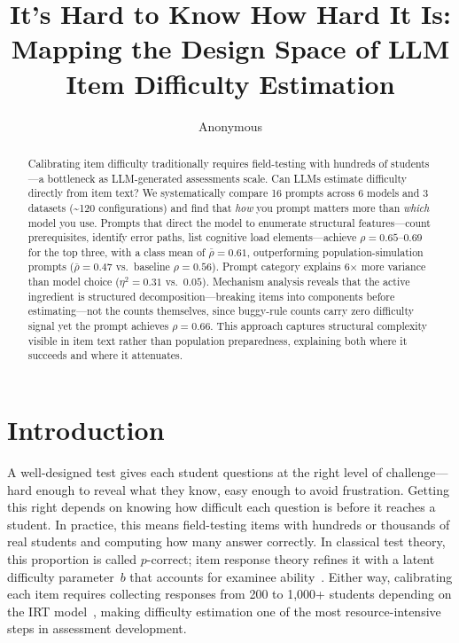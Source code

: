 \documentclass[runningheads]{llncs}
\begin{document}
\title{It's Hard to Know How Hard It Is:\\Mapping the Design Space of LLM Item Difficulty Estimation}

\author{Anonymous}

\maketitle

\begin{abstract}
Calibrating item difficulty traditionally requires field-testing with hundreds of students---a bottleneck as LLM-generated assessments scale. Can LLMs estimate difficulty directly from item text? We systematically compare 16 prompts across 6 models and 3 datasets (\textasciitilde120 configurations) and find that \emph{how} you prompt matters more than \emph{which} model you use. Prompts that direct the model to enumerate structural features---count prerequisites, identify error paths, list cognitive load elements---achieve $\rho=0.65$--$0.69$ for the top three, with a class mean of $\bar{\rho}=0.61$, outperforming population-simulation prompts ($\bar{\rho}=0.47$ vs.\ baseline $\rho=0.56$). Prompt category explains 6$\times$ more variance than model choice ($\eta^2=0.31$ vs.\ $0.05$). Mechanism analysis reveals that the active ingredient is structured decomposition---breaking items into components before estimating---not the counts themselves, since buggy-rule counts carry zero difficulty signal yet the prompt achieves $\rho=0.66$. This approach captures structural complexity visible in item text rather than population preparedness, explaining both where it succeeds and where it attenuates.

\end{abstract}

\section{Introduction}

A well-designed test gives each student questions at the right level of challenge---hard enough to reveal what they know, easy enough to avoid frustration. Getting this right depends on knowing how difficult each question is before it reaches a student. In practice, this means field-testing items with hundreds or thousands of real students and computing how many answer correctly. In classical test theory, this proportion is called $p$-correct; item response theory refines it with a latent difficulty parameter~$b$ that accounts for examinee ability~\cite{embretson2000irt}. Either way, calibrating each item requires collecting responses from 200 to 1,000+ students depending on the IRT model~\cite{deayala2009}, making difficulty estimation one of the most resource-intensive steps in assessment development.
\end{document}
